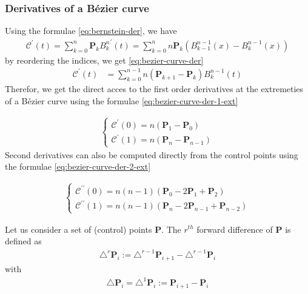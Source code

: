 \subsubsection*{Derivatives of a B\'ezier curve}
\noindent
Using the formulae \ref{eq:bernstein-der}, we have
\begin{align*}
  \mathcal{C}^\prime(t) = \sum_{k=0}^n \mathbf{P}_k {B_k^n}^\prime(t) 
                        = \sum_{k=0}^n n \mathbf{P}_k \left(B_{k-1}^{n-1}(x) - B_k^{n-1}(x) \right)  
\end{align*}
by reordering the indices, we get \ref{eq:bezier-curve-der}
\begin{align}
  \mathcal{C}^\prime(t) &= \sum_{k=0}^{n-1} n \left( \mathbf{P}_{k+1} - \mathbf{P}_k \right) B_k^{n-1}(t) 
  \label{eq:bezier-curve-der}
\end{align}
Therefor, we get the direct acces to the first order derivatives at the extremeties of a B\'ezier curve using the formulae \ref{eq:bezier-curve-der-1-ext}

\begin{align}
  \begin{cases}
    \mathcal{C}^\prime(0) = n \left( \mathbf{P}_{1} - \mathbf{P}_0 \right)  
    \\ 
    \mathcal{C}^\prime(1) = n \left( \mathbf{P}_{n} - \mathbf{P}_{n-1} \right)  
  \end{cases}
  \label{eq:bezier-curve-der-1-ext}
\end{align}
\noindent
Second derivatives can also be computed directly from the control points using the formulae  \ref{eq:bezier-curve-der-2-ext}

\begin{align}
  \begin{cases}
    \mathcal{C}^{\prime\prime}(0) = n(n-1) \left( \mathbf{P}_{0} - 2 \mathbf{P}_1 + \mathbf{P}_{2} \right)  
    \\ 
    \mathcal{C}^{\prime\prime}(1) = n(n-1) \left( \mathbf{P}_{n} - 2 \mathbf{P}_{n-1} + \mathbf{P}_{n-2} \right)  
  \end{cases}
  \label{eq:bezier-curve-der-2-ext}
\end{align}


\begin{definition}
  Let us consider a set of (control) points $\mathbf{P}$.
  The $r^{th}$ forward difference of $\mathbf{P}$ is defined as  
  \begin{align*}
    \triangle^r \mathbf{P}_i := \triangle^{r-1} \mathbf{P}_{i+1} - \triangle^{r-1} \mathbf{P}_i  
  \end{align*}
  with 
  \begin{align*}
    \triangle \mathbf{P}_i = \triangle^1 \mathbf{P}_i := \mathbf{P}_{i+1} - \mathbf{P}_i  
  \end{align*}
\end{definition}

